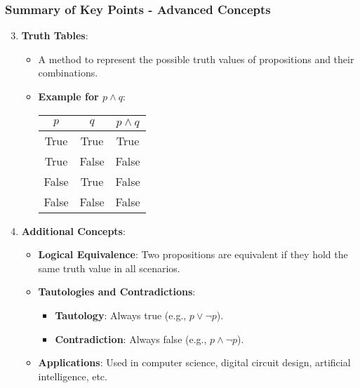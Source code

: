 \documentclass[aspectratio=169]{beamer}
\begin{document}
\begin{frame}[fragile]
    \frametitle{Summary of Key Points - Advanced Concepts}
    \begin{enumerate}
        \setcounter{enumi}{2}
        
        \item \textbf{Truth Tables}:
            \begin{itemize}
                \item A method to represent the possible truth values of propositions and their combinations.
                \item \textbf{Example for $p \land q$}:
                \begin{center}
                \begin{tabular}{|c|c|c|}
                    \hline
                    $p$ & $q$ & $p \land q$ \\
                    \hline
                    True & True & True \\
                    True & False & False \\
                    False & True & False \\
                    False & False & False \\
                    \hline
                \end{tabular}
                \end{center}
            \end{itemize}

        \item \textbf{Additional Concepts}:
            \begin{itemize}
                \item \textbf{Logical Equivalence}: Two propositions are equivalent if they hold the same truth value in all scenarios.
                \item \textbf{Tautologies and Contradictions}:
                    \begin{itemize}
                        \item \textbf{Tautology}: Always true (e.g., $p \lor \neg p$).
                        \item \textbf{Contradiction}: Always false (e.g., $p \land \neg p$).
                    \end{itemize}
                \item \textbf{Applications}: Used in computer science, digital circuit design, artificial intelligence, etc.
            \end{itemize}
    \end{enumerate}
\end{frame}
\end{document}
